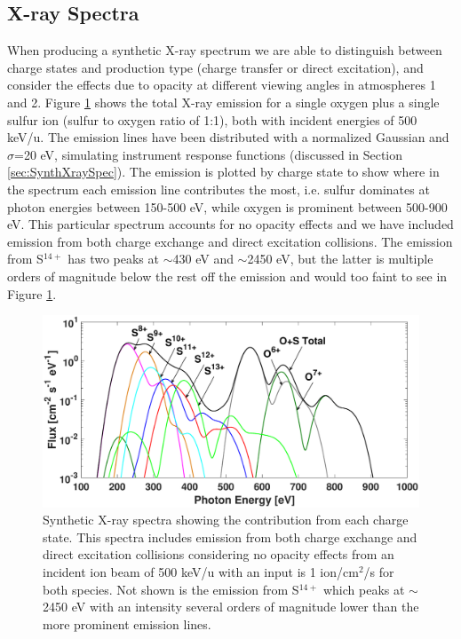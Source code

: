 \documentclass[draft]{agujournal2018}
\begin{document}
\subsection{X-ray Spectra}
\label{sec:XraySpec}

When producing a synthetic X-ray spectrum we are able to distinguish between charge states and production type (charge transfer or direct excitation), and consider the effects due to opacity at different viewing angles in atmospheres 1 and 2.
Figure \ref{fig:XraySpec} shows the total X-ray emission for a single oxygen plus a single sulfur ion (sulfur to oxygen ratio of 1:1), both with incident energies of 500 keV/u.
The emission lines have been distributed with a normalized Gaussian and $\sigma$=20 eV, simulating instrument response functions (discussed in Section \ref{sec:SynthXraySpec}).
The emission is plotted by charge state to show where in the spectrum each emission line contributes the most, i.e. sulfur dominates at photon energies between 150-500 eV, while oxygen is prominent between 500-900 eV.
This particular spectrum accounts for no opacity effects and we have included emission from both charge exchange and direct excitation collisions.
The emission from S$^{14+}$ has two peaks at $\sim$430 eV and $\sim$2450 eV, but the latter is multiple orders of magnitude below the rest off the emission and would too faint to see in Figure \ref{fig:XraySpec}.

\begin{figure}[ht]
    \centering
    \includegraphics[width=\textwidth]{Figures/O+S_CX+DE_500keVNoOpacSpec.eps}
    \caption{Synthetic X-ray spectra showing the contribution from each charge state. This spectra includes emission from both charge exchange and direct excitation collisions considering no opacity effects from an incident ion beam of 500 keV/u with an input is 1 ion/cm$^2$/s for both species. Not shown is the emission from S$^{14+}$ which peaks at $\sim$2450 eV with an intensity several orders of magnitude lower than the more prominent emission lines.}
    \label{fig:XraySpec}
\end{figure}
\end{document}

